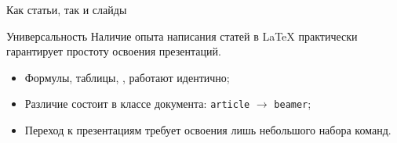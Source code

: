 \begin{frame}[label=article-to-slides]{Как статьи, так и слайды}
  \begin{block}{Универсальность}
    Наличие опыта написания статей в \LaTeX{} практически гарантирует простоту освоения презентаций.
  \end{block}

  \begin{itemize}
    \item Формулы, таблицы, ,  работают идентично;
    \item Различие состоит в классе документа: \texttt{article} $\to$ \texttt{beamer};
    \item Переход к презентациям требует освоения лишь небольшого набора команд.
  \end{itemize}
\end{frame}